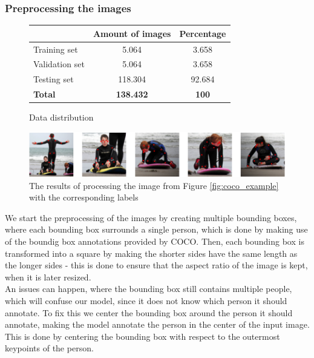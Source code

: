 \documentclass[main.tex]{subfiles}
\begin{document}
\subsubsection{Preprocessing the images}
\begin{figure}[H]
    \centering
    \begin{tabular}{l|c|c}
         & Amount of images & Percentage \\
        \hline
        Training set & 5.064 & 3.658 \\
        \hline
        Validation set & 5.064 & 3.658 \\
        \hline
        Testing set & 118.304 & 92.684 \\
        \hline
        \hline
        \textbf{Total} & \textbf{138.432} & \textbf{100} \\
        \hline
    \end{tabular}
    \caption{Data distribution}
    \label{tab:data_distribution}
\end{figure}
\begin{figure}[H]
    \centering
    \includegraphics[width = \textwidth - 2 cm]{../entities/crop_img.PNG}
    \caption{The results of processing the image from Figure \ref{fig:coco_example} with the corresponding labels}
    \label{fig:crop_img}
\end{figure}
We start the preprocessing of the images by creating multiple bounding boxes, where each bounding box surrounds a single person, which is done by making use of the boundig box annotations provided by COCO. Then, each bounding box is transformed into a square by making the shorter sides have the same length as the longer sides - this is done to ensure that the aspect ratio of the image is kept, when it is later resized. \\
An issues can happen, where the bounding box still contains multiple people, which will confuse our model, since it does not know which person it should annotate. To fix this we center the bounding box around the person it should annotate, making the model annotate the person in the center of the input image. This is done by centering the bounding box with respect to the outermost keypoints of the person. \\
\end{document}
